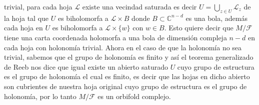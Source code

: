 \documentclass[letterpaper]{report}
\newcommand{\co}{\ensuremath{\mathbb C }}
\begin{document}
trivial, para cada hoja $\mathcal{L}$ existe una vecindad saturada es decir $U=\bigcup_{z\in U}\mathcal{L}_z$ de la hoja tal que $U$ es biholomorfa a $\mathcal{L}\times B$ donde
$B\subset\co^{n-d}$ es una bola, adem\'as cada hoja en $U$ es biholomorfa a $\mathcal{L}\times\{w\}$ con $w\in B$. Esto quiere decir que $M/\mathcal{F}$ tiene una carta coordenada
holomorfa a una bola de dimensi\'on compleja $n-d$ en cada hoja con holonom\'ia trivial. Ahora en el caso de que la holonom\'ia 
no sea trivial, sabemos que el grupo de holonom\'ia es finito y as\'i el teorema generalizado de Reeb \cite{Thurston} nos dice que
igual existe un abierto saturado $U$ cuyo grupo de estructura es el grupo de holonom\'ia el cual es finito, es decir que las hojas
en dicho abierto son cubrientes de nuestra hoja original cuyo grupo de estructura es el grupo de holonom\'ia, por lo tanto
$M/\mathcal{F}$ es un orbifold complejo.
\end{document}
